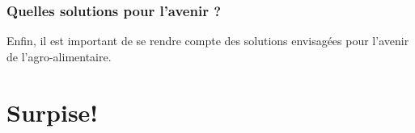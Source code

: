 \documentclass[a4paper,10pt]{report}
\begin{document}
		\subsection{Quelles solutions pour l'avenir ?}
			Enfin, il est important de se rendre compte des solutions envisagées pour l’avenir de l’agro-alimentaire. 
			
\chapter{Surpise!}
	
	\section{}
	
		\subsection{}
		
		\subsection{}
		
		\subsection{}
		
	\section{}
		
		\subsection{}
		
		\subsection{}
		
		\subsection{}
		
	\section{}
	
		\subsection{}
		
\end{document}
